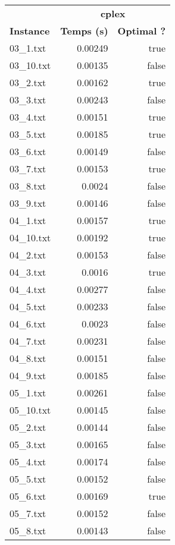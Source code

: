 \documentclass{article}
\begin{document}
\begin{center}
\renewcommand{\arraystretch}{1.4} 
 \begin{tabular}{lrr}
	\hline
 & \multicolumn{2}{c}{\textbf{cplex}}\\
\textbf{Instance}  & \textbf{Temps (s)} & \textbf{Optimal ?} \\\hline

03\_1.txt & 0.00249 & true
\\
03\_10.txt & 0.00135 & false
\\
03\_2.txt & 0.00162 & true
\\
03\_3.txt & 0.00243 & false
\\
03\_4.txt & 0.00151 & true
\\
03\_5.txt & 0.00185 & true
\\
03\_6.txt & 0.00149 & false
\\
03\_7.txt & 0.00153 & true
\\
03\_8.txt & 0.0024 & false
\\
03\_9.txt & 0.00146 & false
\\
04\_1.txt & 0.00157 & true
\\
04\_10.txt & 0.00192 & true
\\
04\_2.txt & 0.00153 & false
\\
04\_3.txt & 0.0016 & true
\\
04\_4.txt & 0.00277 & false
\\
04\_5.txt & 0.00233 & false
\\
04\_6.txt & 0.0023 & false
\\
04\_7.txt & 0.00231 & false
\\
04\_8.txt & 0.00151 & false
\\
04\_9.txt & 0.00185 & false
\\
05\_1.txt & 0.00261 & false
\\
05\_10.txt & 0.00145 & false
\\
05\_2.txt & 0.00144 & false
\\
05\_3.txt & 0.00165 & false
\\
05\_4.txt & 0.00174 & false
\\
05\_5.txt & 0.00152 & false
\\
05\_6.txt & 0.00169 & true
\\
05\_7.txt & 0.00152 & false
\\
05\_8.txt & 0.00143 & false
\\
\hline\end{tabular}
\end{center}
\end{document}
